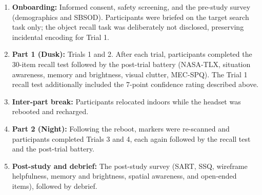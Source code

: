 \begin{enumerate}
  \item \textbf{Onboarding:} Informed consent, safety screening, and the
    pre-study survey (demographics and SBSOD). Participants were briefed on
    the target search task only; the object recall task was deliberately not
    disclosed, preserving incidental encoding for Trial 1.
  \item \textbf{Part 1 (Dusk):} Trials 1 and 2. After each trial,
    participants completed the 30-item recall test followed by the post-trial
    battery (NASA-TLX, situation awareness, memory and brightness, visual
    clutter, MEC-SPQ). The Trial 1 recall test additionally included the
    7-point confidence rating described above.
  \item \textbf{Inter-part break:} Participants relocated indoors while the
    headset was rebooted and recharged.
  \item \textbf{Part 2 (Night):} Following the reboot, markers were
    re-scanned and participants completed Trials 3 and 4, each again followed
    by the recall test and the post-trial battery.
  \item \textbf{Post-study and debrief:} The post-study survey (SART, SSQ,
    wireframe helpfulness, memory and brightness, spatial awareness, and
    open-ended items), followed by debrief.
\end{enumerate}

